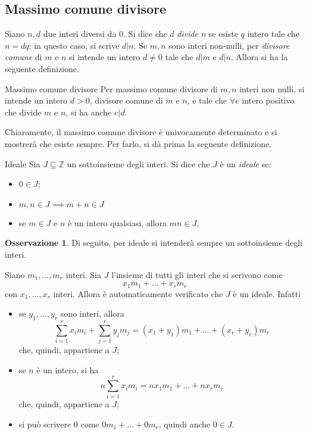 \documentclass[11pt, a4paper]{scrartcl}
\theoremstyle{definition}
\numberwithin{esempio}{section}
\theoremstyle{definition}
\newtheorem{obs}{Osservazione}
\numberwithin{obs}{section}
\numberwithin{nota}{section}
\numberwithin{equation}{subsection}
\begin{document}
\subsection{Massimo comune divisore}
Siano $n, d$ due interi diversi da $0$.
Si dice che $d$ \textit{divide} $n$ se esiste $q$ intero tale che $n = dq$; in questo caso, si scrive $d|n$.
Se $m,n$ sono interi non-nulli, per \textit{divisore comune} di $m$ e $n$ si intende un intero $d\neq 0$ tale che $d | m$ e $d | n$. 
Allora si ha la seguente definizione.
\begin{definizione}
	{Massimo comune divisore}{}
	Per massimo comune divisore di $m,n$ interi non nulli, si intende un intero $d>0$, divisore comune di $m$ e $n$, e tale che $\forall e $ intero positivo che divide $m$ e $n$, si ha anche $e|d$.
\end{definizione}
\noindent Chiaramente, il massimo comune divisore \`e univocamente determinato e si mostrer\`a che esiste sempre. 
Per farlo, si d\`a prima la seguente definizione.
\begin{definizione}
	{Ideale}{}
	Sia $J\subseteq \mathbb{Z}$ un sottoinsieme degli interi. Si dice che $J$ \`e un \textit{ideale} se:
	\begin{itemize}
		\item $0 \in J$;
		\item $m,n\in J\implies m+n \in J$
		\item se $m\in J$ e $n$ \`e un intero qualsiasi, allora $mn \in J$.
	\end{itemize}
\end{definizione}
\begin{obs}
	Di seguito, per ideale si intender\`a sempre un sottoinsieme degli interi.
\end{obs}
\noindent Siano $m_1, \ldots,m_r$ interi. Sia $J$ l'insieme di tutti gli interi che si scrivono come
\[
x_1m_1+\ldots+x_r m_r
\] 
con $x_1,\ldots,x_r$ interi. 
Allora \`e automaticamente verificato che $J$ \`e un ideale. Infatti
\begin{itemize}
	\item se $y_1,\ldots,y_r$ sono interi, allora
		\[
		\sum_{i=1}^{r} x_i m_i +  \sum_{j=1}^{r} y_j m_j = (x_1 + y_1) m_1 + \ldots + (x_r + y_r) m_r
		\] 
		che, quindi, appartiene a $J$;
	\item se $n$ \`e un intero, si ha
		\[
		n \sum_{i=1}^{r} x_i m_i = nx_1m_1 + \ldots+ nx_r m_r
		\] 
		che, quindi, appartiene a $J$;
	\item si pu\`o scrivere $0$ come $0m_1 + \ldots + 0m_r$, quindi anche $0 \in J$.
\end{itemize}
\end{document}
